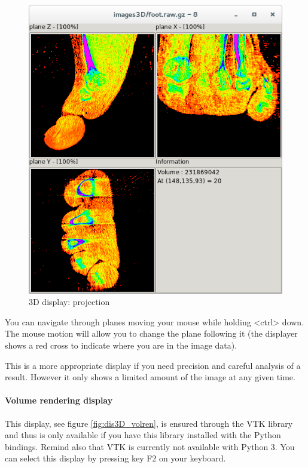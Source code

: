 \documentclass[a4paper,10pt,oneside]{article}
\begin{document}
\begin{figure}
\centering
\includegraphics[scale=0.5]{images/dis3D_proj.png}
\caption{3D display: projection}
\label{fig:dis3D_proj}
\end{figure}

You can navigate through planes moving your mouse while holding <ctrl> down.
The mouse motion will allow you to change the plane following it (the displayer
shows a red cross to indicate where you are in the image data).

This is a more appropriate display if you need precision and careful
analysis of a result. However it only shows a limited amount of the
image at any given time.

\paragraph{Volume rendering display}

This display, see figure \ref{fig:dis3D_volren}, is ensured through the VTK
library and thus is only available if you have this library installed with
the Python bindings. Remind also that VTK is currently not available with Python 3. 
You can select this display by pressing key F2 on your keyboard.
\end{document}

